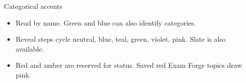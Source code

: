 \begin{standardframe}{Categorical accents}

\begin{itemize}
\item Read  by name. Green and blue can also identify categories.
\item Reveal steps cycle neutral, blue, teal, green, violet, pink. Slate is also available.
\item Red and amber are reserved for status. Saved red Exam Forge topics draw pink.
\end{itemize}
\end{standardframe}
